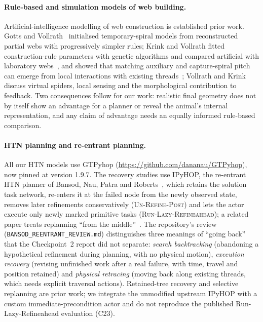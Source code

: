 \paragraph{Rule-based and simulation models of web building.}
Artificial-intelligence modelling of web construction is established prior work. Gotts and
Vollrath~\cite{gotts1991modelling} initialised temporary-spiral models from reconstructed partial webs with
progressively simpler rules; Krink and Vollrath fitted construction-rule parameters with genetic algorithms
and compared artificial with laboratory webs~\cite{krink1997analysing}, and showed that matching auxiliary
and capture-spiral pitch can emerge from local interactions with existing threads~\cite{krink1998emergent};
Vollrath and Krink~\cite{vollrath2020robotics} discuss virtual spiders, local sensing and the morphological
contribution to feedback. Two consequences follow for our work: realistic final geometry does not by itself
show an advantage for a planner or reveal the animal's internal representation, and any claim of advantage
needs an equally informed rule-based comparison.

\paragraph{HTN planning and re-entrant planning.}
All our HTN models use GTPyhop (\url{https://github.com/dananau/GTPyhop}), now pinned at version 1.9.7.
The recovery studies use IPyHOP, the re-entrant HTN planner of Bansod, Nau, Patra and
Roberts~\cite{bansod2021reentrant}, which retains the solution task network, re-enters it at the failed node
from the newly observed state, removes later refinements conservatively (\textsc{Un-Refine-Post}) and lets the
actor execute only newly marked primitive tasks (\textsc{Run-Lazy-Refineahead}); a related paper treats
replanning ``from the middle''~\cite{bansod2022middle}. The repository's review
(\texttt{BANSOD\_\allowbreak{}REENTRANT\_\allowbreak{}REVIEW.md}) distinguishes three meanings of ``going back'' that the
Checkpoint~2 report did not separate: \emph{search backtracking} (abandoning a hypothetical refinement during
planning, with no physical motion), \emph{execution recovery} (revising unfinished work after a real failure,
with time, travel and position retained) and \emph{physical retracing} (moving back along existing threads,
which needs explicit traversal actions). Retained-tree recovery and selective replanning are prior work; we
integrate the unmodified upstream IPyHOP with a custom immediate-precondition actor and do not reproduce the
published Run-Lazy-Refineahead evaluation (C23).

